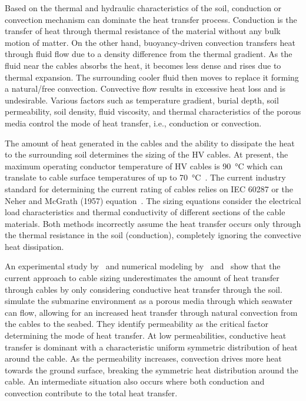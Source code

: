 \documentclass[Journal,letterpaper,InsideFigs]{ascelike-new}
\begin{document}
Based on the thermal and hydraulic characteristics of the soil, conduction or convection mechanism can dominate the heat transfer process. Conduction is the transfer of heat through thermal resistance of the material without any bulk motion of matter. On the other hand, buoyancy-driven convection transfers heat through fluid flow due to a density difference from the thermal gradient. As the fluid near the cables absorbs the heat, it becomes less dense and rises due to thermal expansion. The surrounding cooler fluid then moves to replace it forming a natural/free convection. Convective flow results in excessive heat loss and is undesirable. Various factors such as temperature gradient, burial depth, soil permeability, soil density, fluid viscosity, and thermal characteristics of the porous media control the mode of heat transfer, i.e., conduction or convection. 

The amount of heat generated in the cables and the ability to dissipate the heat to the surrounding soil determines the sizing of the HV cables. At present, the maximum operating conductor temperature of HV cables is \SI{90}{\celsius} which can translate to cable surface temperatures of up to \SI{70}{\celsius}~\cite{hughes2015effect,swaffield2008methods}. The current industry standard for determining the current rating of cables relies on IEC 60287 or the Neher and McGrath (1957) equation~\cite{neher1994calculation,IEC60287:2006}. The sizing equations consider the electrical load characteristics and thermal conductivity of different sections of the cable materials. Both methods incorrectly assume the heat transfer occurs only through the thermal resistance in the soil (conduction), completely ignoring the convective heat dissipation.

An experimental study by~ and numerical modeling by~ and~ show that the current approach to cable sizing underestimates the amount of heat transfer through cables by only considering conductive heat transfer through the soil.~ simulate the submarine environment as a porous media through which seawater can flow, allowing for an increased heat transfer through natural convection from the cables to the seabed. They identify permeability as the critical factor determining the mode of heat transfer. At low permeabilities, conductive heat transfer is dominant with a characteristic uniform symmetric distribution of heat around the cable. As the permeability increases, convection drives more heat towards the ground surface, breaking the symmetric heat distribution around the cable. An intermediate situation also occurs where both conduction and convection contribute to the total heat transfer. 
\end{document}
